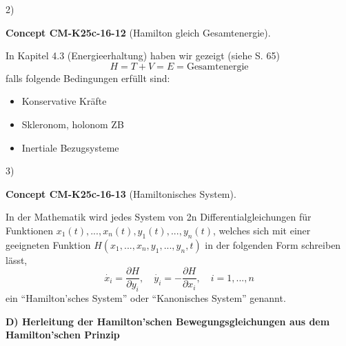 \documentclass[10pt, letterpaper]{article}
\newcommand{\CustomHeading}[3]{%
  \par\medskip\noindent%
  \textbf{#1 #2} \textnormal{(#3)}.\enskip%
}
\newenvironment{CONC}[2]{\begin{unitbox}\CustomHeading{Concept}{#1}{#2}}{\end{unitbox}}
\begin{document}
2) 

\begin{CONC}{CM-K25c-16-12}{Hamilton gleich Gesamtenergie}
In Kapitel 4.3 (Energieerhaltung) haben wir gezeigt (siehe S. 65)
\[H = T + V = E = \text{Gesamtenergie}\]
falls folgende Bedingungen erfüllt sind:
\begin{itemize}
\item Konservative Kräfte
\item Skleronom, holonom ZB
\item Inertiale Bezugsysteme
\end{itemize}
\end{CONC}

3) 

\begin{CONC}{CM-K25c-16-13}{Hamiltonisches System}
In der Mathematik wird jedes System von 2n Differentialgleichungen für Funktionen $x_1(t),...,x_n(t), y_1(t),...,y_n(t)$, welches sich mit einer geeigneten Funktion $H(x_1,...,x_n,y_1,...,y_n,t)$ in der folgenden Form schreiben lässt,
\[\dot{x_i} = \frac{\partial H}{\partial y_i}, \quad \dot{y_i} = -\frac{\partial H}{\partial x_i}, \quad i=1,...,n\]
ein ``Hamilton'sches System'' oder ``Kanonisches System'' genannt.
\end{CONC}


\textbf{D) Herleitung der Hamilton'schen Bewegungsgleichungen aus dem Hamilton'schen Prinzip}
\end{document}
